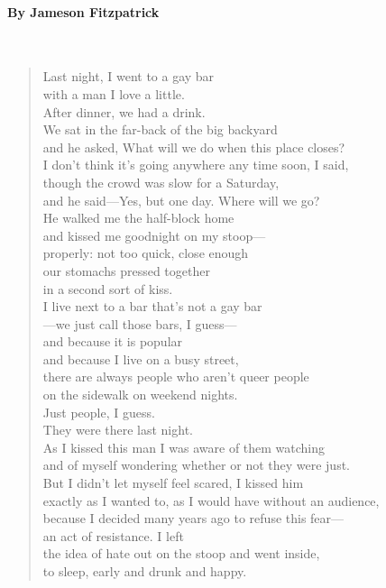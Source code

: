 \paragraph{By Jameson Fitzpatrick}~
\begin{verse}
	Last night, I went to a gay bar\\
	with a man I love a little.\\
	After dinner, we had a drink.\\
	We sat in the far-back of the big backyard\\
	and he asked, What will we do when this place closes?\\
	I don't think it's going anywhere any time soon, I said,\\
	though the crowd was slow for a Saturday,\\
	and he said—Yes, but one day. Where will we go?\\
	He walked me the half-block home\\
	and kissed me goodnight on my stoop—\\
	properly: not too quick, close enough\\
	our stomachs pressed together\\
	in a second sort of kiss.\\
	I live next to a bar that's not a gay bar\\
	—we just call those bars, I guess—\\
	and because it is popular\\
	and because I live on a busy street,\\
	there are always people who aren't queer people\\
	on the sidewalk on weekend nights.\\
	Just people, I guess.\\
	They were there last night.\\
	As I kissed this man I was aware of them watching\\
	and of myself wondering whether or not they were just.\\
	But I didn't let myself feel scared, I kissed him\\
	exactly as I wanted to, as I would have without an audience,\\
	because I decided many years ago to refuse this fear—\\
	an act of resistance. I left\\
	the idea of hate out on the stoop and went inside,\\
	to sleep, early and drunk and happy.\\

\end{verse}
